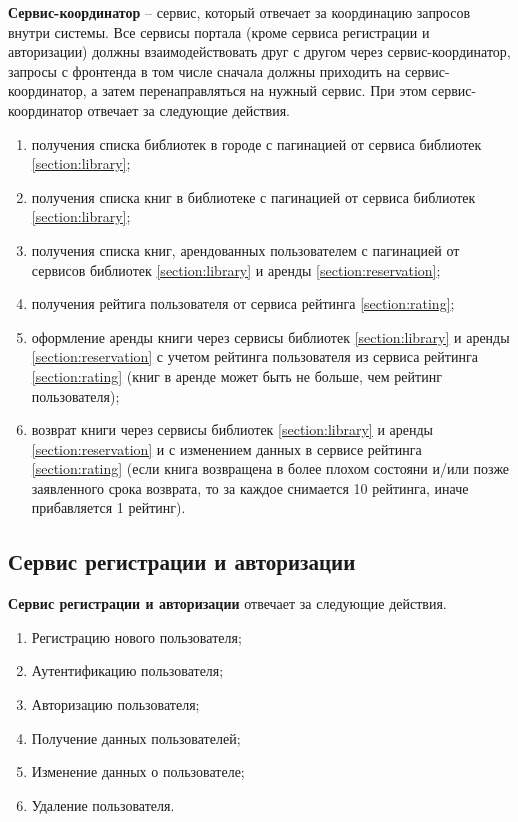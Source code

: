 \textbf{Сервис-координатор} -- сервис, который отвечает за координацию запросов внутри системы. Все сервисы портала (кроме сервиса регистрации и авторизации) должны взаимодействовать друг с другом через сервис-координатор, запросы с фронтенда в том числе сначала должны приходить на сервис-координатор, а затем перенаправляться на нужный сервис. При этом сервис-координатор отвечает за следующие действия.
\begin{enumerate}
	\item получения списка библиотек в городе с пагинацией от сервиса библиотек \ref{section:library};
	\item получения списка книг в библиотеке с пагинацией от сервиса библиотек \ref{section:library};
	\item получения списка книг, арендованных пользователем с пагинацией от сервисов библиотек \ref{section:library} и аренды \ref{section:reservation};
  \item получения рейтига пользователя от сервиса рейтинга \ref{section:rating};
  \item оформление аренды книги через сервисы библиотек \ref{section:library} и аренды \ref{section:reservation} с учетом рейтинга пользователя из сервиса рейтинга \ref{section:rating} (книг в аренде может быть не больше, чем рейтинг пользователя);
	\item возврат книги через сервисы библиотек \ref{section:library} и аренды \ref{section:reservation} и с изменением данных в сервисе рейтинга \ref{section:rating} (если книга возвращена в более плохом состояни и/или позже заявленного срока возврата, то за каждое снимается 10 рейтинга, иначе прибавляется 1 рейтинг).
\end{enumerate}


\subsection{Сервис регистрации и авторизации}

\textbf{Сервис регистрации и авторизации} отвечает за следующие действия.
\begin{enumerate}
	\item Регистрацию нового пользователя;
	\item Аутентификацию пользователя;
	\item Авторизацию пользователя;
  \item Получение данных пользователей;
  \item Изменение данных о пользователе;
	\item Удаление пользователя.
\end{enumerate}

